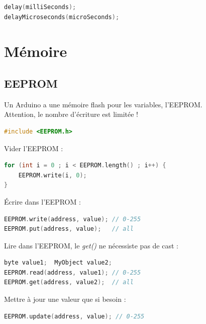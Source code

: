             \emar
            \begin{lstlisting}[language=C]
delay(milliSeconds);
delayMicroseconds(microSeconds);
            \end{lstlisting}


    \section{Mémoire}
        \subsection{EEPROM}
            \bmar
                Un Arduino a une mémoire flash pour les variables, l'EEPROM.\\
                Attention, le nombre d'écriture est limitée !
            \emar
            \begin{lstlisting}[language=C]
#include <EEPROM.h>
            \end{lstlisting}
            \bmar
                Vider l'EEPROM :
            \emar
            \begin{lstlisting}[language=C]
for (int i = 0 ; i < EEPROM.length() ; i++) {
    EEPROM.write(i, 0);
}
            \end{lstlisting}
            \bmar
                Écrire dans l'EEPROM :
            \emar
            \begin{lstlisting}[language=C]
EEPROM.write(address, value); // 0-255
EEPROM.put(address, value);   // all
            \end{lstlisting}
            \bmar
                Lire dans l'EEPROM, le \textit{get()} ne nécessiste pas de cast :
            \emar
            \begin{lstlisting}[language=C]
byte value1;  MyObject value2;
EEPROM.read(address, value1); // 0-255
EEPROM.get(address, value2);  // all
            \end{lstlisting}
            \bmar
                Mettre à jour une valeur que si besoin :
            \emar
            \begin{lstlisting}[language=C]
EEPROM.update(address, value); // 0-255
            \end{lstlisting}

